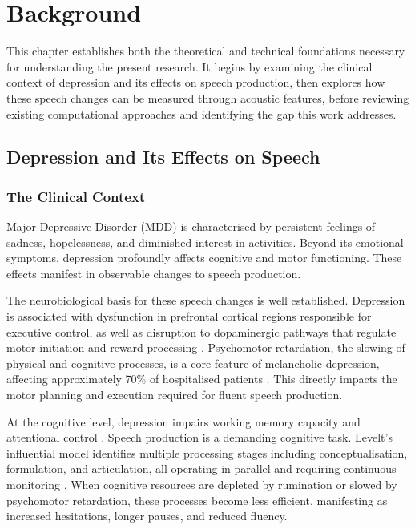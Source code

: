 \chapter{Background}

This chapter establishes both the theoretical and technical foundations necessary for understanding the present research. It begins by examining the clinical context of depression and its effects on speech production, then explores how these speech changes can be measured through acoustic features, before reviewing existing computational approaches and identifying the gap this work addresses.

\section{Depression and Its Effects on Speech}

\subsection{The Clinical Context}

Major Depressive Disorder (MDD) is characterised by persistent feelings of sadness, hopelessness, and diminished interest in activities. Beyond its emotional symptoms, depression profoundly affects cognitive and motor functioning. These effects manifest in observable changes to speech production.

The neurobiological basis for these speech changes is well established. Depression is associated with dysfunction in prefrontal cortical regions responsible for executive control, as well as disruption to dopaminergic pathways that regulate motor initiation and reward processing \cite{Sobin1997}. Psychomotor retardation, the slowing of physical and cognitive processes, is a core feature of melancholic depression, affecting approximately 70\% of hospitalised patients \cite{Sobin1997}. This directly impacts the motor planning and execution required for fluent speech production.

At the cognitive level, depression impairs working memory capacity and attentional control \cite{Joormann2011}. Speech production is a demanding cognitive task. Levelt's influential model identifies multiple processing stages including conceptualisation, formulation, and articulation, all operating in parallel and requiring continuous monitoring \cite{Levelt1989}. When cognitive resources are depleted by rumination or slowed by psychomotor retardation, these processes become less efficient, manifesting as increased hesitations, longer pauses, and reduced fluency.

